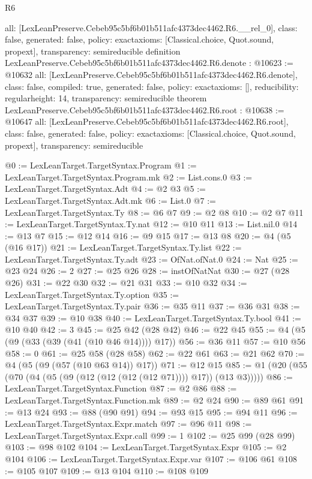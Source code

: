 \begin{lexlean}{R6}
\begin{coremodule}
{  all: [LexLeanPreserve.Cebeb95c5bf6b01b511afc4373dec4462.R6.__rel_0],
  class: false,
  generated: false,
  policy: exact{axioms: [Classical.choice, Quot.sound, propext]},
  transparency: semireducible
}
definition LexLeanPreserve.Cebeb95c5bf6b01b511afc4373dec4462.R6.denote : @10623 := @10632 {
  all: [LexLeanPreserve.Cebeb95c5bf6b01b511afc4373dec4462.R6.denote],
  class: false,
  compiled: true,
  generated: false,
  policy: exact{axioms: []},
  reducibility: regular{height: 14},
  transparency: semireducible
}
theorem LexLeanPreserve.Cebeb95c5bf6b01b511afc4373dec4462.R6.root : @10638 := @10647 {
  all: [LexLeanPreserve.Cebeb95c5bf6b01b511afc4373dec4462.R6.root],
  class: false,
  generated: false,
  policy: exact{axioms: [Classical.choice, Quot.sound, propext]},
  transparency: semireducible
}

@0 := LexLeanTarget.TargetSyntax.Program
@1 := LexLeanTarget.TargetSyntax.Program.mk
@2 := List.cons.{0}
@3 := LexLeanTarget.TargetSyntax.Adt
@4 := @2 @3
@5 := LexLeanTarget.TargetSyntax.Adt.mk
@6 := List.{0}
@7 := LexLeanTarget.TargetSyntax.Ty
@8 := @6 @7
@9 := @2 @8
@10 := @2 @7
@11 := LexLeanTarget.TargetSyntax.Ty.nat
@12 := @10 @11
@13 := List.nil.{0}
@14 := @13 @7
@15 := @12 @14
@16 := @9 @15
@17 := @13 @8
@20 := @4 (@5 (@16 @17))
@21 := LexLeanTarget.TargetSyntax.Ty.list
@22 := LexLeanTarget.TargetSyntax.Ty.adt
@23 := OfNat.ofNat.{0}
@24 := Nat
@25 := @23 @24
@26 := 2
@27 := @25 @26
@28 := instOfNatNat
@30 := @27 (@28 @26)
@31 := @22 @30
@32 := @21 @31
@33 := @10 @32
@34 := LexLeanTarget.TargetSyntax.Ty.option
@35 := LexLeanTarget.TargetSyntax.Ty.pair
@36 := @35 @11
@37 := @36 @31
@38 := @34 @37
@39 := @10 @38
@40 := LexLeanTarget.TargetSyntax.Ty.bool
@41 := @10 @40
@42 := 3
@45 := @25 @42 (@28 @42)
@46 := @22 @45
@55 := @4 (@5 (@9 (@33 (@39 (@41 (@10 @46 @14)))) @17))
@56 := @36 @11
@57 := @10 @56
@58 := 0
@61 := @25 @58 (@28 @58)
@62 := @22 @61
@63 := @21 @62
@70 := @4 (@5 (@9 (@57 (@10 @63 @14)) @17))
@71 := @12 @15
@85 := @1 (@20 (@55 (@70 (@4 (@5 (@9 (@12 (@12 (@12 (@12 @71)))) @17)) (@13 @3)))))
@86 := LexLeanTarget.TargetSyntax.Function
@87 := @2 @86
@88 := LexLeanTarget.TargetSyntax.Function.mk
@89 := @2 @24
@90 := @89 @61
@91 := @13 @24
@93 := @88 (@90 @91)
@94 := @93 @15
@95 := @94 @11
@96 := LexLeanTarget.TargetSyntax.Expr.match
@97 := @96 @11
@98 := LexLeanTarget.TargetSyntax.Expr.call
@99 := 1
@102 := @25 @99 (@28 @99)
@103 := @98 @102
@104 := LexLeanTarget.TargetSyntax.Expr
@105 := @2 @104
@106 := LexLeanTarget.TargetSyntax.Expr.var
@107 := @106 @61
@108 := @105 @107
@109 := @13 @104
@110 := @108 @109

\end{coremodule}
\end{lexlean}
